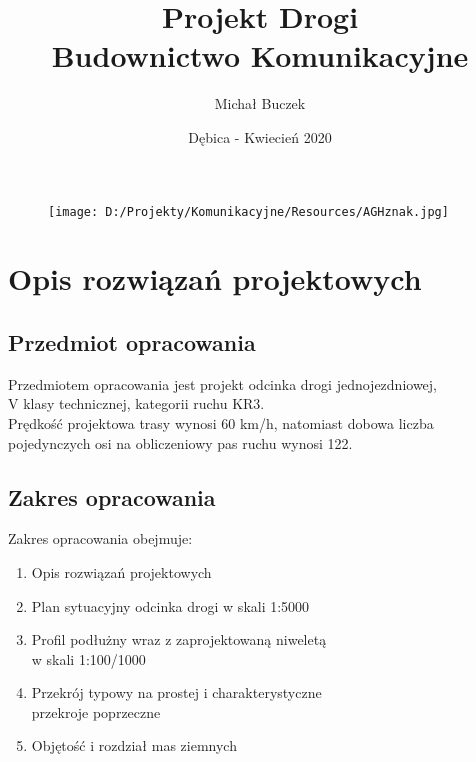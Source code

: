\documentclass[12pt]{article}
\begin{document}
\begin{figure}[!t]
	\centering
	\texttt{[image: D:/Projekty/Komunikacyjne/Resources/AGHznak.jpg]}
    \label{fig:my_label}
\end{figure}
\title{Projekt Drogi\\ Budownictwo Komunikacyjne}
\author{Michał Buczek}
\date{Dębica - Kwiecień 2020}
\maketitle
\newpage
\renewcommand*\contentsname{Spis treści:}
\tableofcontents
\newpage


\section{Opis rozwiązań projektowych}

    \subsection{Przedmiot opracowania}
    Przedmiotem opracowania jest projekt odcinka drogi jednojezdniowej,\\
    V klasy technicznej, kategorii ruchu KR3.\\
    Prędkość projektowa trasy wynosi 60 km/h, natomiast dobowa
    liczba pojedynczych osi na obliczeniowy pas ruchu wynosi 122.
    
    \subsection{Zakres opracowania}
    Zakres opracowania obejmuje:
    \begin{enumerate}
        \item Opis rozwiązań projektowych
        \item Plan sytuacyjny odcinka drogi w skali 1:5000
        \item Profil podłużny wraz z zaprojektowaną niweletą\\
        w skali 1:100/1000
        \item Przekrój typowy na prostej i charakterystyczne\\
        przekroje poprzeczne
        \item Objętość i rozdział mas ziemnych
    \end{enumerate}
    
\end{document}
